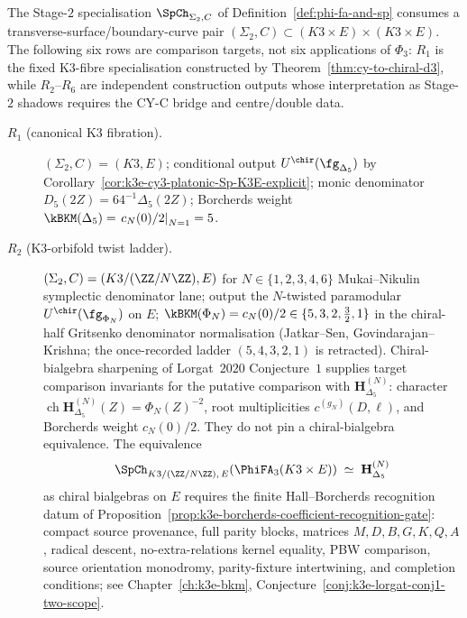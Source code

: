 \begin{remark}
\label{rem:six-sigma2-c-specialisations-K3E}
The Stage-$2$ specialisation $\SpCh_{\Sigma_2, C}$ of Definition~\ref{def:phi-fa-and-sp} consumes a transverse-surface/boundary-curve pair $(\Sigma_2, C) \subset (K3 \times E) \times (K3 \times E)$. The following six rows are comparison targets, not six applications of $\Phi_3$: $R_1$ is the fixed K3-fibre specialisation constructed by Theorem~\ref{thm:cy-to-chiral-d3}, while $R_2$--$R_6$ are independent construction outputs whose interpretation as Stage-$2$ shadows requires the CY-C bridge and centre/double data.
\begin{description}
 \item[$R_1$ (canonical K3 fibration).] $(\Sigma_2, C) = (K3, E)$; conditional output $U^{\chir}(\fg_{\Delta_5})$ by Corollary~\ref{cor:k3e-cy3-platonic-Sp-K3E-explicit}; monic denominator $D_5(2Z)=64^{-1}\Delta_5(2Z)$; Borcherds weight $\kBKM(\Delta_5) = \left.c_N(0)/2\right|_{N=1} = 5$.
 \item[$R_2$ (K3-orbifold twist ladder).] $(\Sigma_2, C) = (K3/(\ZZ/N\ZZ), E)$ for $N \in \{1, 2, 3, 4, 6\}$ Mukai--Nikulin symplectic denominator lane; output the $N$-twisted paramodular $U^{\chir}(\fg_{\Phi_{N}})$ on $E$; $\kBKM(\Phi_N) = c_N(0)/2 \in \{5, 3, 2, \tfrac32, 1\}$ in the chiral-half Gritsenko denominator normalisation (Jatkar--Sen, Govindarajan--Krishna; the once-recorded ladder $(5, 4, 3, 2, 1)$ is retracted). Chiral-bialgebra sharpening of Lorgat~$2020$ Conjecture~$1$ supplies target comparison invariants for the putative comparison with $\mathbf{H}_{\Delta_5}^{(N)}$: character $\operatorname{ch}\mathbf{H}_{\Delta_5}^{(N)}(Z) = \Phi_N(Z)^{-2}$, root multiplicities $c^{(g_N)}(D, \ell)$, and Borcherds weight $c_N(0)/2$. They do not pin a chiral-bialgebra equivalence. The equivalence
 \[
  \SpCh_{K3/(\ZZ/N\ZZ),\, E}(\PhiFA_3(K3 \times E))
  \;\simeq\;
  \mathbf{H}_{\Delta_5}^{(N)}
 \]
 as chiral bialgebras on $E$ requires the finite Hall--Borcherds recognition datum of Proposition~\ref{prop:k3e-borcherds-coefficient-recognition-gate}: compact source provenance, full parity blocks, matrices $M,D,B,G,K,Q,A$, radical descent, no-extra-relations kernel equality, PBW comparison, source orientation monodromy, parity-fixture intertwining, and completion conditions; see Chapter~\ref{ch:k3e-bkm}, Conjecture~\ref{conj:k3e-lorgat-conj1-two-scope}.

\end{description}
\end{remark}
